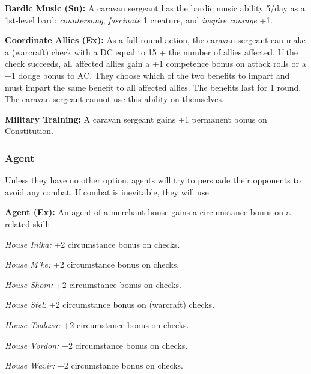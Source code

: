 \textbf{Bardic Music (Su):} A caravan sergeant has the bardic music ability 5/day as a 1st-level bard: \emph{countersong}, \emph{fascinate} 1 creature, and \emph{inspire courage} +1.

\textbf{Coordinate Allies (Ex):} As a full-round action, the caravan sergeant can make a  (warcraft) check with a DC equal to 15 + the number of allies affected. If the check succeeds, all affected allies gain a +1 competence bonus on attack rolls or a +1 dodge bonus to AC. They choose which of the two benefits to impart and must impart the same benefit to all affected allies. The benefits last for 1 round. The caravan sergeant cannot use this ability on themselves.

\textbf{Military Training:} A caravan sergeant gains +1 permanent bonus on Constitution.


\subsubsection{Agent}

Unless they have no other option, agents will try to persuade their opponents to avoid any combat. If combat is inevitable, they will use 

\textbf{Agent (Ex):} An agent of a merchant house gains a circumstance bonus on a related skill:

\textit{House Inika:} +2 circumstance bonus on  checks.

\textit{House M'ke:} +2 circumstance bonus on  checks.

\textit{House Shom:} +2 circumstance bonus on  checks.

\textit{House Stel:} +2 circumstance bonus on  (warcraft) checks.

\textit{House Tsalaxa:} +2 circumstance bonus on  checks.

\textit{House Vordon:} +2 circumstance bonus on  checks.

\textit{House Wavir:} +2 circumstance bonus on  checks.

